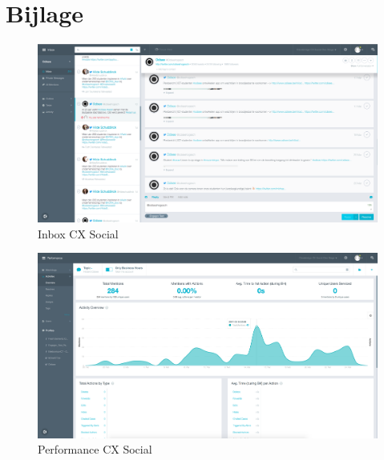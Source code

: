 
\appendix
\renewcommand{\thefigure}{A.\arabic{figure}}

\setcounter{figure}{0}    

\chapter{Bijlage}
\vspace{-3cm}
\begin{figure}[H]
	\centering
	\includegraphics[width=1\textwidth]{Figuren/Inbox.png}
	\caption{Inbox CX Social \cite{EngagorScreenshots}} %
	\label{fig:Inbox}
\end{figure} 

\begin{figure}[H]
	\centering
	\includegraphics[width=1\textwidth]{Figuren/Performance.png}
	\caption{Performance CX Social \cite{EngagorScreenshots}} %
	\label{fig:Performance}
\end{figure} 


